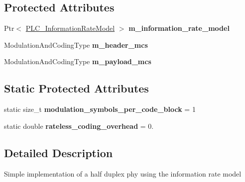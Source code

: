 \subsection*{\-Protected \-Attributes}
\begin{DoxyCompactItemize}
\item 
\hypertarget{classns3_1_1PLC__InformationRatePhy_a6cba12da3612f2baf10625d0dd5a8e55}{\-Ptr$<$ \hyperlink{classns3_1_1PLC__InformationRateModel}{\-P\-L\-C\-\_\-\-Information\-Rate\-Model} $>$ {\bfseries m\-\_\-information\-\_\-rate\-\_\-model}}\label{classns3_1_1PLC__InformationRatePhy_a6cba12da3612f2baf10625d0dd5a8e55}

\item 
\hypertarget{classns3_1_1PLC__InformationRatePhy_a094fc00df54b934a22cd73b40a6de7fb}{\-Modulation\-And\-Coding\-Type {\bfseries m\-\_\-header\-\_\-mcs}}\label{classns3_1_1PLC__InformationRatePhy_a094fc00df54b934a22cd73b40a6de7fb}

\item 
\hypertarget{classns3_1_1PLC__InformationRatePhy_a06c4f6fd00f2943b53a1eabe57fffe52}{\-Modulation\-And\-Coding\-Type {\bfseries m\-\_\-payload\-\_\-mcs}}\label{classns3_1_1PLC__InformationRatePhy_a06c4f6fd00f2943b53a1eabe57fffe52}

\end{DoxyCompactItemize}
\subsection*{\-Static \-Protected \-Attributes}
\begin{DoxyCompactItemize}
\item 
\hypertarget{classns3_1_1PLC__InformationRatePhy_ad811605437ed7f79b619b9f74244aeb9}{static size\-\_\-t {\bfseries modulation\-\_\-symbols\-\_\-per\-\_\-code\-\_\-block} = 1}\label{classns3_1_1PLC__InformationRatePhy_ad811605437ed7f79b619b9f74244aeb9}

\item 
\hypertarget{classns3_1_1PLC__InformationRatePhy_aa276a1823fbce02d8a7c3ccbeed904f0}{static double {\bfseries rateless\-\_\-coding\-\_\-overhead} = 0.}\label{classns3_1_1PLC__InformationRatePhy_aa276a1823fbce02d8a7c3ccbeed904f0}

\end{DoxyCompactItemize}


\subsection{\-Detailed \-Description}
\-Simple implementation of a half duplex phy using the information rate model 

